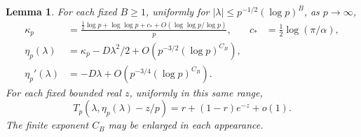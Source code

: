 \documentclass[11pt,letterpaper]{article}
\newtheorem{lemma}[theorem]{Lemma}
\theoremstyle{remark}\newtheorem{remark}[theorem]{Remark}
\numberwithin{equation}{section}
\begin{document}
\begin{lemma}\label{ivd:ll:lem:root}
For each fixed $B\ge1$, uniformly for
$|\lambda|\le p^{-1/2}(\log p)^B$, as $p\to\infty$,
\begin{align}
 \kappa_p&=\frac{\tfrac12\log p+\log\log p+c_*
                 +O(\log\log p/\log p)}p,
 &c_*&=\tfrac12\log(\pi/\alpha),\label{ivd:ll:eq:scalar}\\
 \eta_p(\lambda)&=\kappa_p-D\lambda^2/2
                         +O(p^{-3/2}(\log p)^{C_B}),\label{ivd:ll:eq:anchor}\\
 \eta_p'(\lambda)&=-D\lambda+O(p^{-3/4}(\log p)^{C_B}).
 \label{ivd:ll:eq:root-derivative}
\end{align}
For each fixed bounded real $z$, uniformly in this same range,
\begin{equation}\label{ivd:ll:eq:shift-row}
 T_p(\lambda,\eta_p(\lambda)-z/p)
              =r+(1-r)e^{-z}+o(1).
\end{equation}
The finite exponent $C_B$ may be enlarged in each appearance.
\end{lemma}
\end{document}
